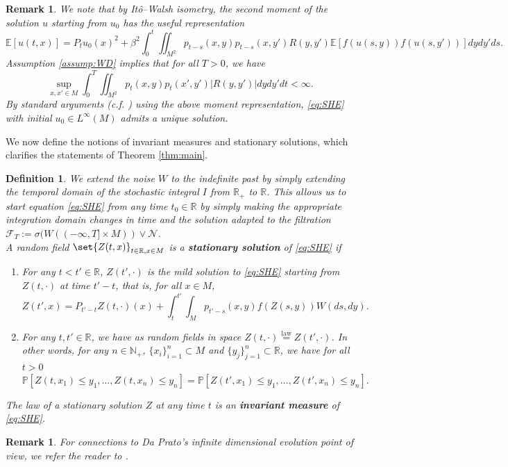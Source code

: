 \documentclass{article}
\newtheorem{definition}[theorem]{Definition}
\newtheorem{remark}[theorem]{Remark}
\numberwithin{theorem}{section}
\def\NN{\mathbb{N}} %
\def\RR{\mathbb{R}} %
\def\PP{\mathbb{P}} %
\def\EE{\mathbb{E}} %
\def\mc{\mathcal}
\begin{document}
\begin{remark}
    We note that by It\^o--Walsh isometry, the second moment of the solution $u$ starting from $u_0$ has the useful representation \[\EE[u(t,x)]=P_tu_0(x)^2+\beta^2\int_0^t \iint_{M^2}p_{t-s}(x,y)p_{t-s}(x,y')R(y,y')\EE[f(u(s,y))f(u(s,y'))]dydy'ds.\]
    Assumption \ref{assump:WD} implies that for all $T>0$, we have \[\sup_{x,x'\in M}\int_0^T\iint_{M^2}p_t(x,y)p_t(x',y')|R(y,y')|dydy'dt<\infty.\]
    By standard arguments (c.f. \cite{Dalang98,ChenKim19,BOTW-Heisenberg,BCHOTW}) using the above moment representation, \eqref{eq:SHE} with initial $u_0\in L^\infty(M)$ admits a unique solution.
\end{remark}

We now define the notions of invariant measures and stationary solutions, which clarifies the statements of Theorem \ref{thm:main}. 

\begin{definition}\label{def: stationary sol and inv meas}
    We extend the noise $W$ to the indefinite past by simply extending the temporal domain of the stochastic integral $I$ from $\RR_+$ to $\RR$. This allows us to start equation \eqref{eq:SHE} from any time $t_0\in \RR$ by simply making the appropriate integration domain changes in time and the solution adapted to the filtration $\mc{F}_{T}:=\sigma(W((-\infty,T]\times M))\vee \mathcal{N}$.\\
    A random field \(\set{Z(t,x)}_{t\in \RR,x\in M}\) is a \textbf{stationary solution} of \eqref{eq:SHE} if \begin{enumerate}
        \item For any $t<t'\in \RR$, \(Z(t',\cdot)\) is the mild solution to \eqref{eq:SHE} starting from $Z(t,\cdot)$ at time $t'-t$, that is, for all $x\in M$, \[Z(t',x)=P_{t'-t}Z(t,\cdot)(x)+\int_{t}^{t'}\int_M p_{t'-s}(x,y)f(Z(s,y))W(ds,dy).\]
        \item For any $t,t'\in \RR$, we have as random fields in space \(Z(t,\cdot)\stackrel{\mathrm{law}}{=}Z(t',\cdot)\). In other words, for any $n\in \NN_+$, $\{x_i\}_{i=1}^n\subset M$ and $\{y_j\}_{j=1}^n\subset \RR$, we have for all $t>0$ \[\PP[Z(t,x_1)\le y_1,\dots, Z(t,x_n)\le y_n]=\PP[Z(t'
        ,x_1)\le y_1,\dots, Z(t',x_n)\le y_n].\]
    \end{enumerate}
    The law of a stationary solution $Z$ at any time $t$ is an \textbf{invariant measure} of \eqref{eq:SHE}.
\end{definition}


\begin{remark}
    For connections to Da Prato's infinite dimensional evolution point of view, we refer the reader to \cite{COTX25}.
\end{remark}
\end{document}
